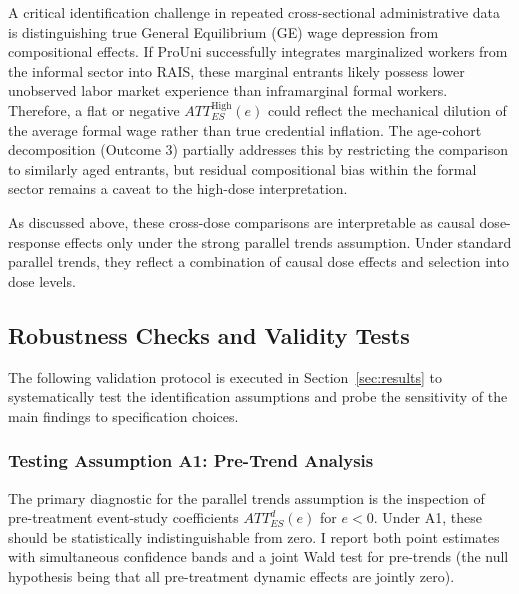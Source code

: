A critical identification challenge in repeated cross-sectional administrative data is distinguishing true General Equilibrium (GE) wage depression from compositional effects. If ProUni successfully integrates marginalized workers from the informal sector into RAIS, these marginal entrants likely possess lower unobserved labor market experience than inframarginal formal workers. Therefore, a flat or negative $ATT_{ES}^{\text{High}}(e)$ could reflect the mechanical dilution of the average formal wage rather than true credential inflation. The age-cohort decomposition (Outcome 3) partially addresses this by restricting the comparison to similarly aged entrants, but residual compositional bias within the formal sector remains a caveat to the high-dose interpretation.

As discussed above, these cross-dose comparisons are interpretable as causal dose-response effects only under the strong parallel trends assumption. Under standard parallel trends, they reflect a combination of causal dose effects and selection into dose levels.


\subsection{Robustness Checks and Validity Tests}
\label{sec:robustness}

The following validation protocol is executed in Section~\ref{sec:results} to systematically test the identification assumptions and probe the sensitivity of the main findings to specification choices.



\subsubsection{Testing Assumption A1: Pre-Trend Analysis}
\label{sec:robustness_pretrends}

The primary diagnostic for the parallel trends assumption is the inspection of pre-treatment event-study coefficients $ATT_{ES}^d(e)$ for $e < 0$. Under A1, these should be statistically indistinguishable from zero. I report both point estimates with simultaneous confidence bands and a joint Wald test for pre-trends (the null hypothesis being that all pre-treatment dynamic effects are jointly zero).

